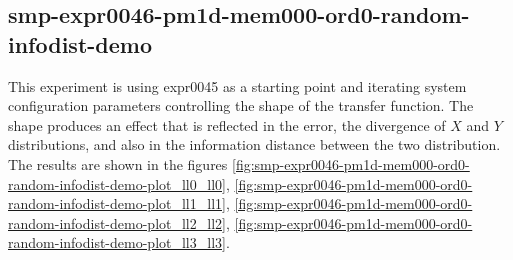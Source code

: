 \subsection*{smp-expr0046-pm1d-mem000-ord0-random-infodist-demo}
\label{sec:smp-expr0046-pm1d-mem000-ord0-random-infodist-demo}

This experiment is using expr0045 as a starting point and
iterating system configuration parameters controlling the shape of the
transfer function. The shape produces an effect that is reflected in
the error, the divergence of $X$ and $Y$ distributions, and also in the
information distance between the two distribution.
The results are shown in the figures
\ref{fig:smp-expr0046-pm1d-mem000-ord0-random-infodist-demo-plot_ll0_ll0},
\ref{fig:smp-expr0046-pm1d-mem000-ord0-random-infodist-demo-plot_ll1_ll1},
\ref{fig:smp-expr0046-pm1d-mem000-ord0-random-infodist-demo-plot_ll2_ll2},
\ref{fig:smp-expr0046-pm1d-mem000-ord0-random-infodist-demo-plot_ll3_ll3}.

\newpage
{}%

\newpage

